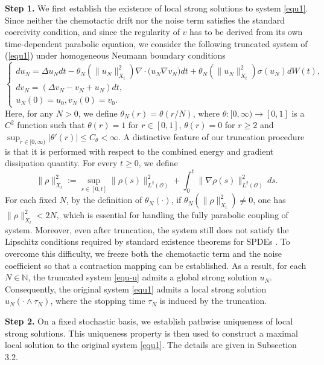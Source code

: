 \documentclass[reqno, 11pt]{amsart}
\theoremstyle{definition}
\numberwithin{equation}{section} \numberwithin{lem}{section}
\numberwithin{thm}{section} \numberwithin{prop}{section}
\numberwithin{cor}{section} \numberwithin{rem}{section}
\numberwithin{defn}{section}
\begin{document}
\textbf{Step 1.}
We first establish the existence of local strong solutions to system \eqref{equ1}. Since neither the chemotactic drift nor the noise term satisfies the standard coercivity condition, and  since the regularity of $v$ has to be derived from its own time-dependent parabolic equation,  we consider the following
truncated system of (\ref{equ1}) under homogeneous Neumann boundary conditions
\begin{equation}\label{equ-u}
\begin{cases}
du_N=\Delta u_Ndt-\theta_N(\|u_N\|_{X_t}^2)\nabla\cdot\big(u_N\nabla v_N\big)dt+\theta_N(\|u_N\|_{X_t}^2)\sigma(u_N)dW(t),\\
d v_N=(\Delta v_N-v_N+u_N)dt,\\
u_N(0)=u_0, v_N(0)=v_0.
\end{cases}
\end{equation}
Here, for any $N>0$, we define $\theta_N(r)=\theta(r/N)$, where  $\theta:[0,\infty)\to[0,1]$ is a $C^2$ function such that $\theta(r)=1$ for $r\in [0,1]$, $\theta(r)=0$ for $r\ge2$ and $\sup_{r\in[0,\infty)}|\theta'(r)|\leq C_\theta<\infty$.
A distinctive feature of our truncation procedure is that it is performed with respect to the combined energy and gradient dissipation quantity. For every $t\ge 0$, we define 
\[
\|\rho \|_{X_t}^2:=\sup_{s\in[0,t]}\|\rho (s)\|_{L^2(\mathcal {O})}^2+\int_0^t\|\nabla \rho(s)\|_{L^2(\mathcal {O})}^2\,ds.
\]
For each fixed $N$, by the definition of $\theta_N(\cdot)$, if $\theta_N(\|\rho\|_{X_t}^2)\ne0$,  one has $\|\rho \|_{X_t}^2< 2N,$
which is essential for handling the fully parabolic coupling of system. Moreover, even after truncation, the system still does not satisfy the Lipschitz conditions required by standard existence theorems for SPDEs \cite [Theorem 4.2.4] {liu2015stochastic}. To overcome this difficulty, we freeze both the chemotactic term and the noise coefficient so that a contraction mapping can be established. As a result, for each $N\in \mathbb{N}$, the truncated system \eqref{equ-u} admits a global strong solution $u_N$.
Consequently, the original system \eqref{equ1} admits a local strong solution $u_N(\cdot\wedge\tau_N)$, where the stopping time $\tau_N$ is induced by the truncation.
  
  \textbf{Step 2.}
  On a fixed stochastic basis, we establish pathwise uniqueness of local strong solutions. This uniqueness property is then used to construct a maximal local solution to the original system \eqref{equ1}. The details are given in Subsection 3.2.
\end{document}
